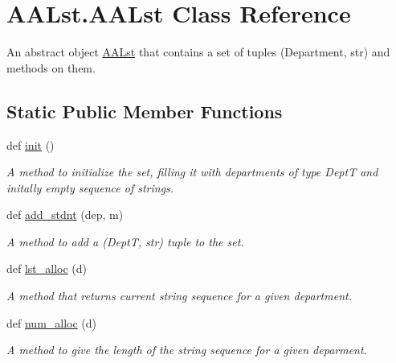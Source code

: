 \hypertarget{class_a_a_lst_1_1_a_a_lst}{}\section{A\+A\+Lst.\+A\+A\+Lst Class Reference}
\label{class_a_a_lst_1_1_a_a_lst}


An abstract object \mbox{\hyperlink{class_a_a_lst_1_1_a_a_lst}{A\+A\+Lst}} that contains a set of tuples (Department, str) and methods on them.  


\subsection*{Static Public Member Functions}
\begin{DoxyCompactItemize}
\item 
\mbox{\label{class_a_a_lst_1_1_a_a_lst_ade2ae95f7a0e7ad568b8fdcccdc18556}} 
def \mbox{\hyperlink{class_a_a_lst_1_1_a_a_lst_ade2ae95f7a0e7ad568b8fdcccdc18556}{init}} ()
\begin{DoxyCompactList}\small\item\em A method to initialize the set, filling it with departments of type DeptT and initally empty sequence of strings. \end{DoxyCompactList}\item 
\mbox{\label{class_a_a_lst_1_1_a_a_lst_a6cc4b320d445656b347115c3d440be45}} 
def \mbox{\hyperlink{class_a_a_lst_1_1_a_a_lst_a6cc4b320d445656b347115c3d440be45}{add\+\_\+stdnt}} (dep, m)
\begin{DoxyCompactList}\small\item\em A method to add a (DeptT, str) tuple to the set. \end{DoxyCompactList}\item 
def \mbox{\hyperlink{class_a_a_lst_1_1_a_a_lst_aecd1653cb6c7db79cff37d34294a9fc2}{lst\+\_\+alloc}} (d)
\begin{DoxyCompactList}\small\item\em A method that returns current string sequence for a given department. \end{DoxyCompactList}\item 
def \mbox{\hyperlink{class_a_a_lst_1_1_a_a_lst_a7751d151fd74a6ea51e662ab9f69284a}{num\+\_\+alloc}} (d)
\begin{DoxyCompactList}\small\item\em A method to give the length of the string sequence for a given deparment. \end{DoxyCompactList}\end{DoxyCompactItemize}

